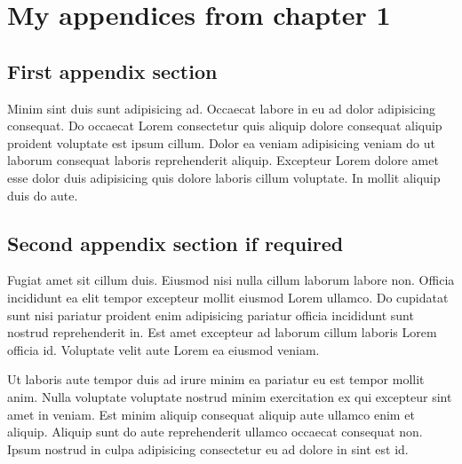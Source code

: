 \chapter{My appendices from chapter 1 \label{app:chapter_1}}

\section{First appendix section}
Minim sint duis sunt adipisicing ad. Occaecat labore in eu ad dolor adipisicing consequat. Do occaecat Lorem consectetur quis aliquip dolore consequat aliquip proident voluptate est ipsum cillum. Dolor ea veniam adipisicing veniam do ut laborum consequat laboris reprehenderit aliquip. Excepteur Lorem dolore amet esse dolor duis adipisicing quis dolore laboris cillum voluptate. In mollit aliquip duis do aute.

\section{Second appendix section if required}
Fugiat amet sit cillum duis. Eiusmod nisi nulla cillum laborum labore non. Officia incididunt ea elit tempor excepteur mollit eiusmod Lorem ullamco. Do cupidatat sunt nisi pariatur proident enim adipisicing pariatur officia incididunt sunt nostrud reprehenderit in. Est amet excepteur ad laborum cillum laboris Lorem officia id. Voluptate velit aute Lorem ea eiusmod veniam.

Ut laboris aute tempor duis ad irure minim ea pariatur eu est tempor mollit anim. Nulla voluptate voluptate nostrud minim exercitation ex qui excepteur sint amet in veniam. Est minim aliquip consequat aliquip aute ullamco enim et aliquip. Aliquip sunt do aute reprehenderit ullamco occaecat consequat non. Ipsum nostrud in culpa adipisicing consectetur eu ad dolore in sint est id.